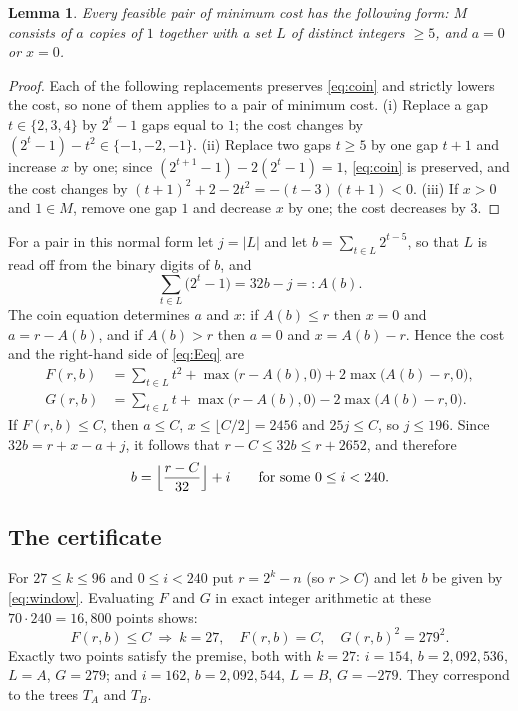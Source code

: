 \documentclass[11pt]{amsart}
\newtheorem{lemma}[theorem]{Lemma}
\theoremstyle{remark}
\begin{document}
\begin{lemma}\label{lem:normal}
Every feasible pair of minimum cost has the following form: $M$ consists of $a$ copies of $1$ together with a set $L$ of distinct integers $\ge5$, and $a=0$ or $x=0$.
\end{lemma}

\begin{proof}
Each of the following replacements preserves \eqref{eq:coin} and strictly lowers the cost, so none of them applies to a pair of minimum cost.
(i) Replace a gap $t\in\{2,3,4\}$ by $2^t-1$ gaps equal to $1$; the cost changes by $(2^t-1)-t^2\in\{-1,-2,-1\}$.
(ii) Replace two gaps $t\ge5$ by one gap $t+1$ and increase $x$ by one; since $(2^{t+1}-1)-2(2^t-1)=1$, \eqref{eq:coin} is preserved, and the cost changes by $(t+1)^2+2-2t^2=-(t-3)(t+1)<0$.
(iii) If $x>0$ and $1\in M$, remove one gap $1$ and decrease $x$ by one; the cost decreases by $3$.
\end{proof}

For a pair in this normal form let $j=|L|$ and let $b=\sum_{t\in L}2^{t-5}$, so that $L$ is read off from the binary digits of $b$, and
\[
\sum_{t\in L}\bigl(2^t-1\bigr)=32b-j=:A(b).
\]
The coin equation determines $a$ and $x$: if $A(b)\le r$ then $x=0$ and $a=r-A(b)$, and if $A(b)>r$ then $a=0$ and $x=A(b)-r$.
Hence the cost and the right-hand side of \eqref{eq:Eeq} are
\begin{align*}
F(r,b)&=\sum_{t\in L}t^2+\max\bigl(r-A(b),0\bigr)+2\max\bigl(A(b)-r,0\bigr),\\
G(r,b)&=\sum_{t\in L}t+\max\bigl(r-A(b),0\bigr)-2\max\bigl(A(b)-r,0\bigr).
\end{align*}
If $F(r,b)\le C$, then $a\le C$, $x\le\lfloor C/2\rfloor=2456$ and $25j\le C$, so $j\le196$.
Since $32b=r+x-a+j$, it follows that $r-C\le 32b\le r+2652$, and therefore
\begin{equation}\label{eq:window}
b=\Bigl\lfloor\frac{r-C}{32}\Bigr\rfloor+i\qquad\text{for some }0\le i<240 .
\end{equation}

\subsection{The certificate}

For $27\le k\le96$ and $0\le i<240$ put $r=2^k-n$ (so $r>C$) and let $b$ be given by \eqref{eq:window}.
Evaluating $F$ and $G$ in exact integer arithmetic at these $70\cdot240=16{,}800$ points shows:
\begin{equation}\label{eq:cert}
F(r,b)\le C\ \Longrightarrow\ k=27,\quad F(r,b)=C,\quad G(r,b)^2=279^2 .
\end{equation}
Exactly two points satisfy the premise, both with $k=27$: $i=154$, $b=2{,}092{,}536$, $L=A$, $G=279$; and $i=162$, $b=2{,}092{,}544$, $L=B$, $G=-279$.
They correspond to the trees $T_A$ and $T_B$.
\end{document}
